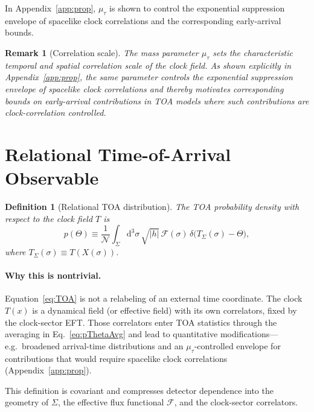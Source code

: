 \documentclass[pdflatex,sn-mathphys-num]{sn-jnl}
\theoremstyle{thmstylethree}
\newtheorem{definition}{Definition}[section]
\theoremstyle{thmstyleone}
\theoremstyle{thmstyletwo}
\newtheorem{remark}{Remark}[section]
\numberwithin{equation}{section}
\newcommand{\dd}{\mathrm{d}}
\newcommand{\Sig}{\Sigma}
\newcommand{\F}{\mathcal{F}}
\begin{document}
    In Appendix~\ref{app:prop}, $\mu_\tau$ is shown to control the exponential suppression envelope of spacelike clock correlations and the corresponding early-arrival bounds.
    
    \begin{remark}[Correlation scale]
The mass parameter $\mu_\tau$ sets the characteristic temporal and spatial correlation scale of the clock field. As shown explicitly in Appendix~\ref{app:prop}, the same parameter controls the exponential suppression envelope of spacelike clock correlations and thereby motivates corresponding bounds on early-arrival contributions in TOA models where such contributions are clock-correlation controlled.
    \end{remark}

    \section{Relational Time-of-Arrival Observable}
    
    \begin{definition}[Relational TOA distribution]
The TOA probability density with respect to the clock field $T$ is
\begin{equation}
    p(\Theta) \equiv
    \frac{1}{\mathcal{N}}
    \int_\Sig \dd^3\sigma\,\sqrt{|h|}\,
    \F(\sigma)\,
    \delta\!\big(T_\Sig(\sigma)-\Theta\big),
    \label{eq:TOA}
\end{equation}
where $T_\Sig(\sigma)\equiv T(X(\sigma))$.
    \end{definition}
    
    \paragraph{Why this is nontrivial.}
        Equation~\eqref{eq:TOA} is not a relabeling of an external time coordinate. The clock $T(x)$ is a dynamical field (or effective field) with its own correlators, fixed by the clock-sector EFT. Those correlators enter TOA statistics through the averaging in Eq.~\eqref{eq:pThetaAvg} and lead to quantitative modifications---e.g.\ broadened arrival-time distributions and an $\mu_\tau$-controlled envelope for contributions that would require spacelike clock correlations (Appendix~\ref{app:prop}).
        
        This definition is covariant and compresses detector dependence into the geometry of $\Sig$, the effective flux functional $\F$, and the clock-sector correlators.
\end{document}
